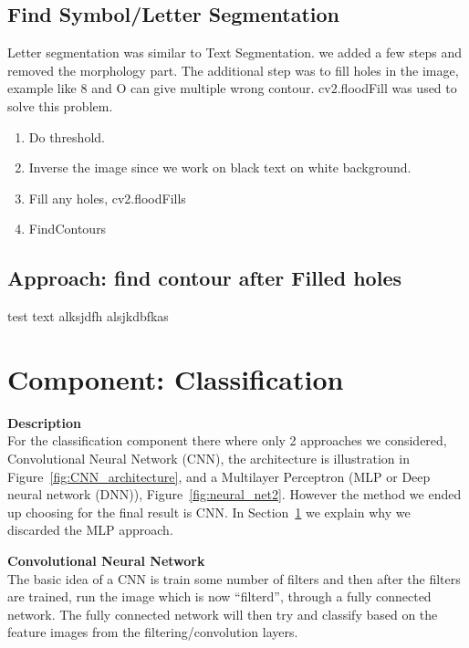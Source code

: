 \documentclass[Report.tex]{subfiles}
\begin{document}
\subsection{Find Symbol/Letter Segmentation}\label{subsec:Find_Symb}
Letter segmentation was similar to Text Segmentation. we added a few steps and removed the morphology part. The additional step was to fill holes in the image, example like 8 and O can give multiple wrong contour. cv2.floodFill was used to solve this problem.
\begin{enumerate}
  \item Do threshold.
  \item Inverse the image since we work on black text on white background.
  \item Fill any holes, cv2.floodFills
  \item FindContours
\end{enumerate}
\subsection{Approach: find contour after Filled holes}
test text alksjdfh alsjkdbfkas


\section{Component: Classification}
\label{Method:Classification}
\begin{flushleft}
  \textbf{Description} \\
  For the classification component there where only 2 approaches we considered,
  Convolutional Neural Network (CNN), the architecture is illustration in
  Figure~\ref{fig:CNN_architecture}, and a Multilayer Perceptron (MLP or Deep
  neural network (DNN)), Figure~\ref{fig:neural_net2}. However the method we ended up choosing for the final result is CNN. In
  Section~\ref{Method:Classification} we explain why we discarded
  the MLP approach. \par
\end{flushleft}

\begin{flushleft}
  \textbf{Convolutional Neural Network} \\
  The basic idea of a CNN is train some number of filters and then
  after the filters are trained, run the image which is now ``filterd'', through
  a fully connected network. The fully connected network will then try and
  classify based on the feature images from the filtering/convolution layers. \par
\end{flushleft}
\end{document}
